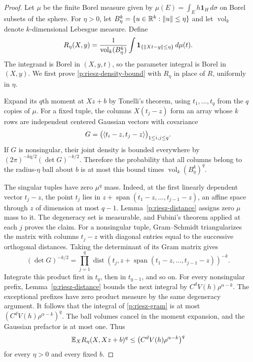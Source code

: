 \begin{proof}
Let $\mu$ be the finite Borel measure given by
$\mu(E)=\int_E h\mathbf1_H\,d\sigma$ on Borel subsets of the
sphere.  For $\eta>0$, let
$B_\eta^k=\{u\in\mathbb R^k:\left\lVert u\right\rVert\le\eta\}$ and let
$\operatorname{vol}_k$ denote $k$-dimensional Lebesgue measure.  Define
\begin{equation}\label{p:riesz-ball-average}
 R_\eta(X,y)=
 \frac{1}{\operatorname{vol}_k(B_\eta^k)}
 \int \mathbf1_{\{\left\lVert Xt-y\right\rVert\le\eta\}}\,d\mu(t).
\end{equation}
The integrand is Borel in $(X,y,t)$, so the parameter integral is
Borel in $(X,y)$.  We first prove
\eqref{p:riesz-density-bound} with $R_\eta$ in place of $R$,
uniformly in $\eta$.

Expand its $q$th moment at $Xz+b$ by Tonelli's theorem, using
$t_1,\ldots,t_q$ from the $q$ copies of $\mu$.  For a fixed tuple,
the columns $X(t_j-z)$ form an array whose $k$ rows are independent
centered Gaussian vectors with covariance
\[
 G=\bigl(\langle t_i-z,t_j-z\rangle\bigr)_{1\le i,j\le q}.
\]
If $G$ is nonsingular, their joint density is bounded everywhere by
$(2\pi)^{-kq/2}(\det G)^{-k/2}$.  Therefore the probability that
all columns belong to the radius-$\eta$ ball about $b$ is at most
this bound times $\operatorname{vol}_k(B_\eta^k)^q$.

The singular tuples have zero $\mu^q$ mass.  Indeed, at the first
linearly dependent vector $t_j-z$, the point $t_j$ lies in
$z+\operatorname{span}(t_1-z,\ldots,t_{j-1}-z)$, an affine space
through $z$ of dimension at most $q-1$.  Lemma~\ref{p:riesz-distance}
assigns zero $\mu$ mass to it.  The degeneracy set is measurable,
and Fubini's theorem applied at each $j$ proves the claim.  For a
nonsingular tuple, Gram--Schmidt triangularizes the matrix with
columns $t_j-z$ with diagonal entries equal to the successive
orthogonal distances.  Taking the determinant of its Gram matrix
gives
\begin{equation}\label{p:riesz-gram}
 (\det G)^{-k/2}
 =\prod_{j=1}^q
 \operatorname{dist}\!\left(
 t_j,z+\operatorname{span}(t_1-z,\ldots,t_{j-1}-z)
 \right)^{-k}.
\end{equation}
Integrate this product first in $t_q$, then in $t_{q-1}$, and so on.
For every nonsingular prefix, Lemma~\ref{p:riesz-distance} bounds
the next integral by $C^dV(h)\rho^{\alpha-k}$.  The exceptional
prefixes have zero product measure by the same degeneracy argument.
It follows that the integral of
\eqref{p:riesz-gram} is at most
$(C^dV(h)\rho^{\alpha-k})^q$.  The ball volumes cancel in the
moment expansion, and the Gaussian prefactor is at most one.
Thus
\[
 \mathbb E_X R_\eta(X,Xz+b)^q
 \le \bigl(C^dV(h)\rho^{\alpha-k}\bigr)^q
\]
for every $\eta>0$ and every fixed $b$.


\end{proof}
